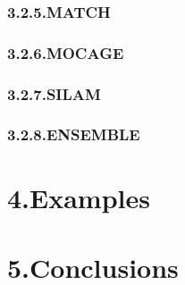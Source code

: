 \documentclass[9pt]{report}
\begin{document}
\subsubsection{3.2.5.\hspace*{0.5em}MATCH}\label{sec-match}%

\subsubsection{3.2.6.\hspace*{0.5em}MOCAGE}\label{sec-mocage}%

\subsubsection{3.2.7.\hspace*{0.5em}SILAM}\label{sec-silam}%

\subsubsection{3.2.8.\hspace*{0.5em}ENSEMBLE}\label{sec-ensemble}%

\section{4.\hspace*{0.5em}Examples}\label{sec-examples}%

\section{5.\hspace*{0.5em}Conclusions}\label{sec-conclusions}%
\end{document}
